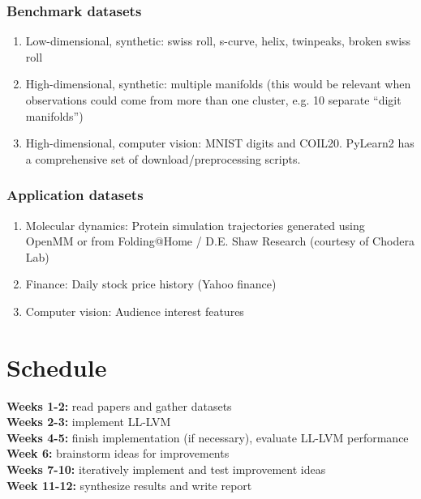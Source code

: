 \documentclass{article}
\begin{document}
\subsubsection{Benchmark datasets}
\begin{enumerate}
\item Low-dimensional, synthetic: swiss roll, s-curve, helix, twinpeaks, broken swiss roll
\item High-dimensional, synthetic: multiple manifolds (this would be relevant when observations could come from more than one cluster, e.g. 10 separate ``digit manifolds'')
\item High-dimensional, computer vision: MNIST digits and COIL20. PyLearn2 has a comprehensive set of download/preprocessing scripts.
\end{enumerate}
\subsubsection{Application datasets}
\begin{enumerate}
\item Molecular dynamics: Protein simulation trajectories generated using OpenMM or from Folding@Home / D.E. Shaw Research (courtesy of Chodera Lab)
\item Finance: Daily stock price history (Yahoo finance)
\item Computer vision: Audience interest features
\end{enumerate}

\section{Schedule}
\textbf{Weeks 1-2:} read papers and gather datasets\\
\textbf{Weeks 2-3:} implement LL-LVM\\
\textbf{Weeks 4-5:} finish implementation (if necessary), evaluate LL-LVM performance\\
\textbf{Week 6:} brainstorm ideas for improvements \\
\textbf{Weeks 7-10:} iteratively implement and test improvement ideas\\
\textbf{Week 11-12:} synthesize results  and write report




\end{document}
